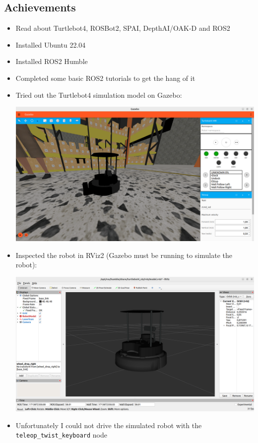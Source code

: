 \documentclass{article}
\begin{document}
\subsection{Achievements}
\begin{itemize}
    \item Read about Turtlebot4, ROSBot2, SPAI, DepthAI/OAK-D and ROS2
    \item Installed Ubuntu 22.04
    \item Installed ROS2 Humble
    \item Completed some basic ROS2 tutorials to get the hang of it
    \item Tried out the Turtlebot4 simulation model on Gazebo:\par
    \begin{minipage}{\linewidth}
        \centering
        \includegraphics[width=1\linewidth]{images/Gazebo_turtlebot4.png}
    \end{minipage}

    \item Inspected the robot in RViz2 (Gazebo must be running to simulate the robot):\par
    \begin{minipage}{\linewidth}
        \centering
        \includegraphics[width=1\linewidth]{images/rviz2_turtlebot4.png}
    \end{minipage}
    
    \item Unfortunately I could not drive the simulated robot with the \verb|teleop_twist_keyboard| node
    
\end{itemize}
\end{document}
